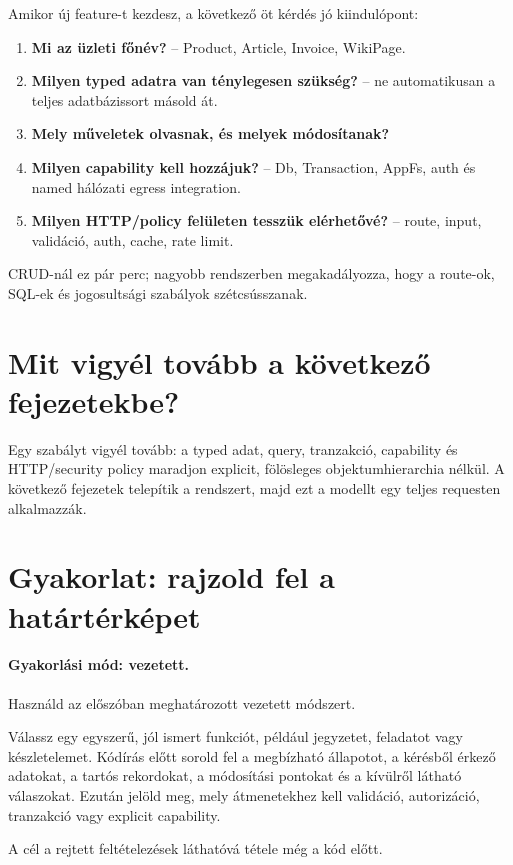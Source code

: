 Amikor új feature-t kezdesz, a következő öt kérdés jó kiindulópont:

\begin{enumerate}
  \item \textbf{Mi az üzleti főnév?} -- Product, Article, Invoice, WikiPage.
  \item \textbf{Milyen typed adatra van ténylegesen szükség?} -- ne automatikusan a teljes adatbázissort másold át.
  \item \textbf{Mely műveletek olvasnak, és melyek módosítanak?}
  \item \textbf{Milyen capability kell hozzájuk?} -- Db, Transaction, AppFs, auth és named hálózati egress integration.
  \item \textbf{Milyen HTTP/policy felületen tesszük elérhetővé?} -- route, input, validáció, auth, cache, rate limit.
\end{enumerate}

CRUD-nál ez pár perc; nagyobb rendszerben megakadályozza, hogy a route-ok, SQL-ek és jogosultsági szabályok szétcsússzanak.

\section{Mit vigyél tovább a következő fejezetekbe?}

Egy szabályt vigyél tovább: a typed adat, query, tranzakció, capability és HTTP/security policy maradjon explicit, fölösleges objektumhierarchia nélkül. A következő fejezetek telepítik a rendszert, majd ezt a modellt egy teljes  requesten alkalmazzák.

\section{Gyakorlat: rajzold fel a határtérképet}
\paragraph{Gyakorlási mód: vezetett.} Használd az előszóban meghatározott vezetett módszert.

Válassz egy egyszerű, jól ismert funkciót, például jegyzetet, feladatot vagy készletelemet. Kódírás előtt sorold fel a megbízható állapotot, a kérésből érkező adatokat, a tartós rekordokat, a módosítási pontokat és a kívülről látható válaszokat. Ezután jelöld meg, mely átmenetekhez kell validáció, autorizáció, tranzakció vagy explicit capability.

A cél a rejtett feltételezések láthatóvá tétele még a kód előtt.

